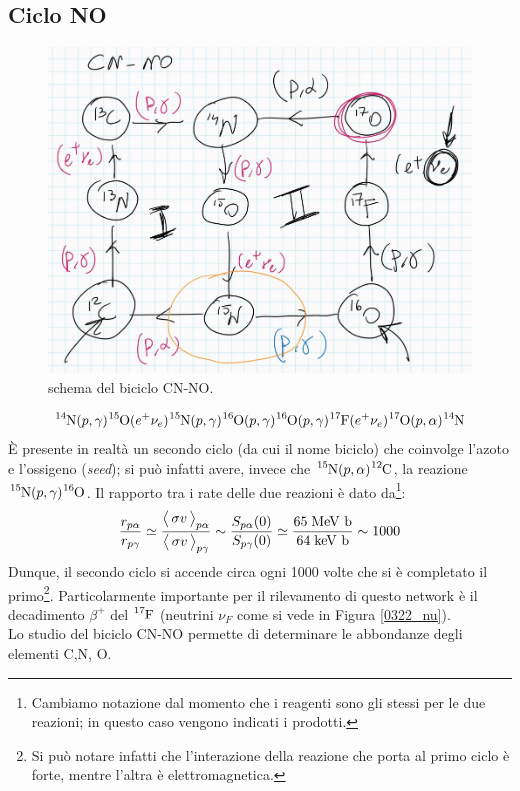 \subsection{Ciclo NO}
\begin{figure}[!h]
	\centering
	\includegraphics[scale=0.5]{Immagini/0422_biCNNOscheme.png}
	\caption{schema del biciclo CN-NO.}
	\label{0422_NO}
\end{figure}
$$\ce{^{14}N}(p,\gamma)\ce{^{15}O}(e^+\nu_e)\ce{^{15}N}(p,\gamma)\ce{^{16}O}(p,\gamma)\ce{^{16}O}(p,\gamma)\ce{^{17}F}(e^+\nu_e)\ce{^{17}O}(p,\alpha)\ce{^{14}N}$$
È presente in realtà un secondo ciclo (da cui il nome biciclo) che coinvolge l'azoto e l'ossigeno (\textit{seed}); si può infatti avere, invece che $\ce{^{15}N}(p,\alpha)\ce{^{12}C}$, la reazione $\ce{^{15}N}(p,\gamma)\ce{^{16}O}$. Il rapporto tra i rate delle due reazioni è dato da\footnote{Cambiamo notazione dal momento che i reagenti sono gli stessi per le due reazioni; in questo caso vengono indicati i prodotti.}:
$$\frac{r_{p\alpha}}{r_{p\gamma}}\simeq \frac{\bigl\langle\, \sigma v\, \bigr\rangle_{p\alpha}}{\bigl\langle\, \sigma v\, \bigr\rangle_{p\gamma}}\sim\frac{S_{p\alpha}(0)}{S_{p\gamma}(0)}\simeq \frac{65\;\mbox{MeV b}}{64\;\mbox{keV b}}\sim 1000$$
Dunque, il secondo ciclo si accende circa ogni 1000 volte che si è completato il primo\footnote{Si può notare infatti che l'interazione della reazione che porta al primo ciclo è forte, mentre l'altra è elettromagnetica.}. Particolarmente importante per il rilevamento di questo network è il decadimento $\beta^+$ del $\ce{^{17}F}$ (neutrini $\nu_F$ come si vede in Figura \ref{0322_nu}).\\ 
Lo studio del biciclo CN-NO permette di determinare le abbondanze degli elementi C,N, O. 

